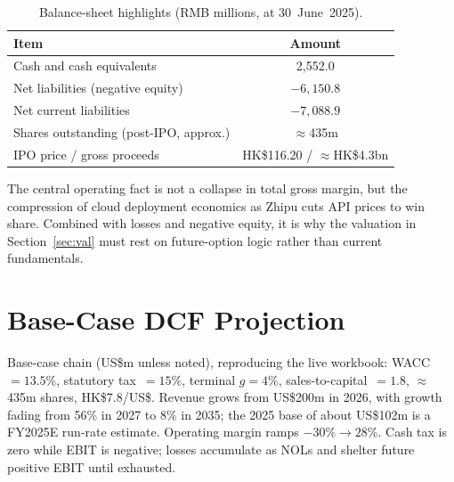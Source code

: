 \documentclass[11pt]{article}
\begin{document}
\begin{table}[H]
\centering
\caption{Balance-sheet highlights (RMB millions, at 30~June~2025).}
\begin{tabular}{lc}
\toprule
Item & Amount \\
\midrule
Cash and cash equivalents & 2{,}552.0 \\
Net liabilities (negative equity) & $-6{,}150.8$ \\
Net current liabilities & $-7{,}088.9$ \\
\midrule
Shares outstanding (post-IPO, approx.) & $\approx$435m \\
IPO price / gross proceeds & HK\$116.20 / $\approx$HK\$4.3bn \\
\bottomrule
\end{tabular}
\end{table}

The central operating fact is not a collapse in total gross margin, but the compression of cloud deployment
economics as Zhipu cuts API prices to win share. Combined with losses and negative equity, it is why the
valuation in Section~\ref{sec:val} must rest on future-option logic rather than current fundamentals.

\clearpage
\section{Base-Case DCF Projection}
\label{sec:proj}
Base-case chain (US\$m unless noted), reproducing the live workbook: WACC~$=13.5\%$, statutory tax~$=15\%$,
terminal $g=4\%$, sales-to-capital~$=1.8$, $\approx$435m shares, HK\$7.8/US\$. Revenue grows from US\$200m in
2026, with growth fading from 56\% in 2027 to 8\% in 2035; the 2025 base of about US\$102m is a FY2025E
run-rate estimate. Operating margin ramps $-30\%\!\to\!28\%$. Cash tax is zero while EBIT
is negative; losses accumulate as NOLs and shelter future positive EBIT until exhausted.
\end{document}
